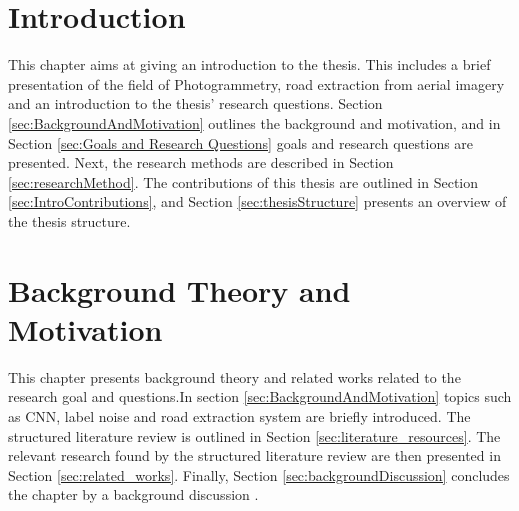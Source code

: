 \documentclass[a4paper]{book}
\begin{document}
\tableofcontents

\listoffigures

\listoftables


\mainmatter



\chapter{Introduction}
\label{cha:Introduction}
This chapter aims at giving an introduction to the thesis. This includes a brief presentation of the field of Photogrammetry, road extraction from aerial imagery and an introduction to the thesis' research questions. Section \ref{sec:BackgroundAndMotivation} outlines the background and motivation, and in Section \ref{sec:Goals and Research Questions} goals and research questions are presented. Next, the research methods are described in Section \ref{sec:researchMethod}. The contributions of this thesis are outlined in Section \ref{sec:IntroContributions}, and Section \ref{sec:thesisStructure} presents an overview of the thesis structure.













\chapter{Background Theory and Motivation}\label{T-B}
\label{cha:TheoryAndBackground}
This chapter presents background theory and related works related to the research goal and questions.In section \ref{sec:BackgroundAndMotivation} topics such as \ac{CNN}, label noise and road extraction system are briefly introduced. The structured literature review is outlined in Section \ref{sec:literature_resources}. The relevant research found by the structured literature review are then presented in Section \ref{sec:related_works}. Finally, Section \ref{sec:backgroundDiscussion} concludes the chapter by a background discussion .







\end{document}
